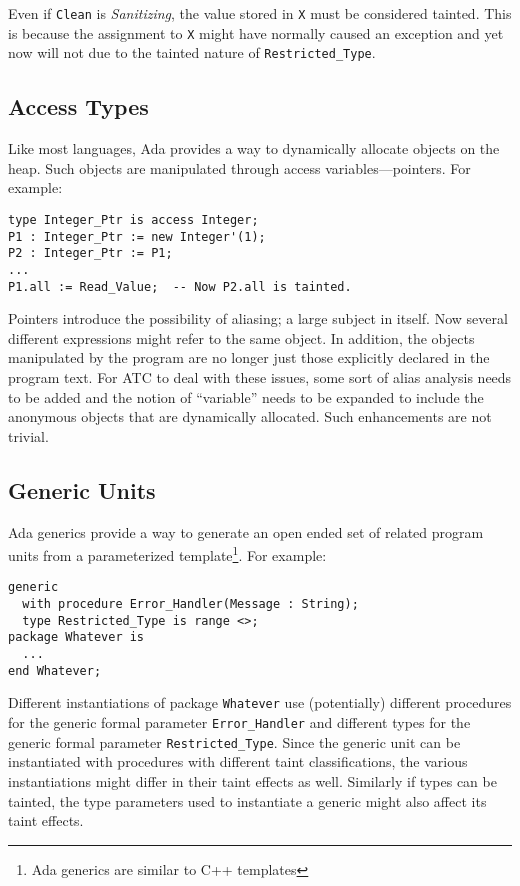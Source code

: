 \documentclass{article}
\begin{document}
Even if \texttt{Clean} is \textit{Sanitizing}, the value stored in \texttt{X} must be considered tainted. This is because the assignment to \texttt{X} might have normally caused an exception and yet now will not due to the tainted nature of \texttt{Restricted\_Type}.

\subsection{Access Types}

Like most languages, Ada provides a way to dynamically allocate objects on the heap. Such objects are manipulated through access variables---pointers. For example:

\begin{verbatim}
type Integer_Ptr is access Integer;
P1 : Integer_Ptr := new Integer'(1);
P2 : Integer_Ptr := P1;
...
P1.all := Read_Value;  -- Now P2.all is tainted.
\end{verbatim}

Pointers introduce the possibility of aliasing; a large subject in itself. Now several different expressions might refer to the same object. In addition, the objects manipulated by the program are no longer just those explicitly declared in the program text. For ATC to deal with these issues, some sort of alias analysis needs to be added and the notion of ``variable'' needs to be expanded to include the anonymous objects that are dynamically allocated. Such enhancements are not trivial.

\subsection{Generic Units}

Ada generics provide a way to generate an open ended set of related program units from a parameterized template\footnote{Ada generics are similar to C++ templates}. For example:

\begin{verbatim}
generic
  with procedure Error_Handler(Message : String);
  type Restricted_Type is range <>;
package Whatever is
  ...
end Whatever;
\end{verbatim}

Different instantiations of package \texttt{Whatever} use (potentially) different procedures for the generic formal parameter \texttt{Error\_Handler} and different types for the generic formal parameter \texttt{Restricted\_Type}. Since the generic unit can be instantiated with procedures with different taint classifications, the various instantiations might differ in their taint effects as well. Similarly if types can be tainted, the type parameters used to instantiate a generic might also affect its taint effects.
\end{document}
